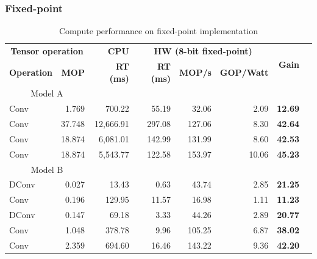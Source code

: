 \subsubsection{Fixed-point}
\begin{table}[!htp]\centering
	\caption{Compute performance on fixed-point implementation}\label{tab:performance_fixed_point }
	\scriptsize
	\begin{tabular}{lrrrrrrr}\toprule
		\multicolumn{2}{c}{\textbf{Tensor operation}} &\textbf{CPU} &\multicolumn{3}{c}{\textbf{HW (8-bit fixed-point)}} &\multirow{2}{*}{\textbf{Gain}} \\\cmidrule{1-6}
		\textbf{Operation} &\textbf{MOP} &\textbf{RT (ms)} &\textbf{RT (ms)} &\textbf{MOP/s} &\textbf{GOP/Watt} & \\\midrule
		\multicolumn{2}{c}{Model A} & & & & & \\
		Conv &1.769 &700.22 &55.19 &32.06 &2.09 &\textbf{12.69} \\
		Conv &37.748 &12,666.91 &297.08 &127.06 &8.30 &\textbf{42.64} \\
		Conv &18.874 &6,081.01 &142.99 &131.99 &8.60 &\textbf{42.53} \\
		Conv &18.874 &5,543.77 &122.58 &153.97 &10.06 &\textbf{45.23} \\
		\multicolumn{2}{c}{Model B} & & & & & \\
		DConv &0.027 &13.43 &0.63 &43.74 &2.85 &\textbf{21.25} \\
		Conv &0.196 &129.95 &11.57 &16.98 &1.11 &\textbf{11.23} \\
		DConv &0.147 &69.18 &3.33 &44.26 &2.89 &\textbf{20.77} \\
		Conv &1.048 &378.78 &9.96 &105.25 &6.87 &\textbf{38.02} \\
		Conv &2.359 &694.60 &16.46 &143.22 &9.36 &\textbf{42.20} \\
		\bottomrule
	\end{tabular}
\end{table}




